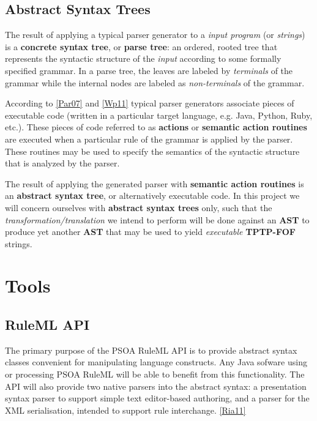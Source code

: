 \documentclass[letterpaper,10pt,english]{sphinxmanual}
\begin{document}
\subsection{Abstract Syntax Trees}
\label{project-proposal/index:abstract-syntax-trees}
The result of applying a typical parser generator to a \emph{input program} (or
\emph{strings}) is a
\textbf{concrete syntax tree}, or \textbf{parse tree}: an ordered, rooted tree that
represents the syntactic structure of the \emph{input} according to some formally
specified grammar.  In a parse tree, the leaves are labeled by \emph{terminals} of the
grammar while the internal nodes are labeled as \emph{non-terminals} of the grammar.

According to {\hyperref[project-proposal/index:par07]{{[}Par07{]}}} and {\hyperref[project-proposal/index:wp11]{{[}Wp11{]}}} typical parser generators associate
pieces of executable code (written in a particular target language, e.g. Java, Python,
Ruby, etc.).  These pieces of code referred to as \textbf{actions} or \textbf{semantic
action routines} are executed when a particular rule of the grammar is applied
by the parser.  These routines may be used to specify the semantics of the
syntactic structure that is analyzed by the parser.

The result of applying the generated parser with
\textbf{semantic action routines} is an \textbf{abstract syntax tree}, or alternatively
executable code.  In this project we will concern ourselves with \textbf{abstract
syntax trees} only, such that the \emph{transformation/translation} we intend to
perform will be done against an \textbf{AST} to produce yet another \textbf{AST} that may
be used to yield \emph{executable} \textbf{TPTP-FOF} strings.


\section{Tools}
\label{project-proposal/index:tools}

\subsection{RuleML API}
\label{project-proposal/index:ruleml-api}
The primary purpose of the PSOA RuleML API is to provide abstract syntax
classes convenient for manipulating language constructs. Any Java sofware
using or processing PSOA RuleML will be able to benefit from this functionality.
The API will also provide two native parsers into the abstract syntax:
a presentation syntax parser to support simple text editor-based authoring,
and a parser for the XML serialisation, intended to support rule interchange.
{\hyperref[project-proposal/index:ria11]{{[}Ria11{]}}}
\end{document}
